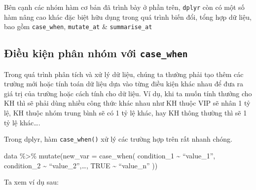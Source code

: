 \documentclass[]{krantz}
\makeatletter
\newenvironment{Shaded}{\begin{snugshade}}{\end{snugshade}}
\newcommand{\CommentTok}[1]{\textcolor[rgb]{0.37,0.37,0.37}{\textit{#1}}}
\newcommand{\DataTypeTok}[1]{\textcolor[rgb]{0.27,0.27,0.27}{#1}}
\newcommand{\DecValTok}[1]{\textcolor[rgb]{0.06,0.06,0.06}{#1}}
\newcommand{\KeywordTok}[1]{\textcolor[rgb]{0.27,0.27,0.27}{\textbf{#1}}}
\newcommand{\NormalTok}[1]{#1}
\newcommand{\OperatorTok}[1]{\textcolor[rgb]{0.43,0.43,0.43}{\textbf{#1}}}
\newcommand{\OtherTok}[1]{\textcolor[rgb]{0.37,0.37,0.37}{#1}}
\newcommand{\StringTok}[1]{\textcolor[rgb]{0.5,0.5,0.5}{#1}}
\renewenvironment{quote}{\begin{VF}}{\end{VF}}
\newenvironment{kframe}{%
\medskip{}
\setlength{\fboxsep}{.8em}
 \def\at@end@of@kframe{}%
 \ifinner\ifhmode%
  \def\at@end@of@kframe{\end{minipage}}%
  \begin{minipage}{\columnwidth}%
 \fi\fi%
 \def\FrameCommand##1{\hskip\@totalleftmargin \hskip-\fboxsep
 \colorbox{shadecolor}{##1}\hskip-\fboxsep
     \hskip-\linewidth \hskip-\@totalleftmargin \hskip\columnwidth}%
 \MakeFramed {\advance\hsize-\width
   \@totalleftmargin\z@ \linewidth\hsize
   \@setminipage}}%
 {\par\unskip\endMakeFramed%
 \at@end@of@kframe}
\renewenvironment{Shaded}{\begin{kframe}}{\end{kframe}}
\renewenvironment{Shaded}{\begin{snugshade}}{\end{snugshade}}
\renewcommand{\CommentTok}[1]{\textcolor[rgb]{0.56,0.35,0.01}{\textit{#1}}}
\renewcommand{\DataTypeTok}[1]{\textcolor[rgb]{0.13,0.29,0.53}{#1}}
\renewcommand{\DecValTok}[1]{\textcolor[rgb]{0.00,0.00,0.81}{#1}}
\renewcommand{\KeywordTok}[1]{\textcolor[rgb]{0.13,0.29,0.53}{\textbf{#1}}}
\renewcommand{\NormalTok}[1]{#1}
\renewcommand{\OperatorTok}[1]{\textcolor[rgb]{0.81,0.36,0.00}{\textbf{#1}}}
\renewcommand{\OtherTok}[1]{\textcolor[rgb]{0.56,0.35,0.01}{#1}}
\renewcommand{\StringTok}[1]{\textcolor[rgb]{0.31,0.60,0.02}{#1}}
\theoremstyle{definition}
\theoremstyle{definition}
\theoremstyle{definition}
\theoremstyle{remark}
\makeatother
\begin{document}
Bên cạnh các nhóm hàm cơ bản đã trình bày ở phần trên, \texttt{dplyr}
còn có một số hàm nâng cao khác đặc biệt hữu dụng trong quá trình biến
đổi, tổng hợp dữ liệu, bao gồm \texttt{case\_when}, \texttt{mutate\_at}
\& \texttt{summarise\_at}

\hypertarget{iu-kin-phan-nhom-vi-case_when}{%
\subsection{\texorpdfstring{Điều kiện phân nhóm với
\texttt{case\_when}}{Điều kiện phân nhóm với case\_when}}\label{iu-kin-phan-nhom-vi-case_when}}

Trong quá trình phân tích và xử lý dữ liệu, chúng ta thường phải tạo
thêm các trường mới hoặc tính toán dữ liệu dựa vào từng điều kiện khác
nhau để đưa ra giá trị của trường hoặc cách tính cho dữ liệu. Ví dụ, khi
ta muốn tính thưởng cho KH thì sẽ phải dùng nhiều công thức khác nhau
như KH thuộc VIP sẽ nhân 1 tỷ lệ, KH thuộc nhóm trung bình sẽ có 1 tỷ lệ
khác, hay KH thông thường thì sẽ 1 tỷ lệ khác\ldots{}.

Trong dplyr, hàm \texttt{case\_when()} xử lý các trường hợp trên rất
nhanh chóng.

\begin{quote}
data \%\textgreater{}\% mutate(new\_var = case\_when( condition\_1
\textasciitilde{} ``value\_1'', condition\_2 \textasciitilde{}
``value\_2'',\ldots{}, TRUE \textasciitilde{} ``value\_n'' ))
\end{quote}

Ta xem ví dụ sau:

\begin{Shaded}
\end{Shaded}
\end{document}
